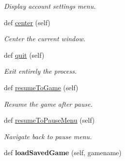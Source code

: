 \begin{DoxyCompactItemize}
\begin{DoxyCompactList}\small\item\em Display account settings menu. \end{DoxyCompactList}\item 
\hypertarget{classsrc_1_1game_1_1_game_a243a1df9b63a0f081b90fa29146a4af6}{}def \hyperlink{classsrc_1_1game_1_1_game_a243a1df9b63a0f081b90fa29146a4af6}{center} (self)\label{classsrc_1_1game_1_1_game_a243a1df9b63a0f081b90fa29146a4af6}

\begin{DoxyCompactList}\small\item\em Center the current window. \end{DoxyCompactList}\item 
\hypertarget{classsrc_1_1game_1_1_game_aa7856f8d00f279cc139d131cb2e8d8ea}{}def \hyperlink{classsrc_1_1game_1_1_game_aa7856f8d00f279cc139d131cb2e8d8ea}{quit} (self)\label{classsrc_1_1game_1_1_game_aa7856f8d00f279cc139d131cb2e8d8ea}

\begin{DoxyCompactList}\small\item\em Exit entirely the process. \end{DoxyCompactList}\item 
\hypertarget{classsrc_1_1game_1_1_game_a19d0646df1f0cb57f8262412487d5270}{}def \hyperlink{classsrc_1_1game_1_1_game_a19d0646df1f0cb57f8262412487d5270}{resume\+To\+Game} (self)\label{classsrc_1_1game_1_1_game_a19d0646df1f0cb57f8262412487d5270}

\begin{DoxyCompactList}\small\item\em Resume the game after pause. \end{DoxyCompactList}\item 
\hypertarget{classsrc_1_1game_1_1_game_add2df3ddda7fa333cadb6fcfa060eaef}{}def \hyperlink{classsrc_1_1game_1_1_game_add2df3ddda7fa333cadb6fcfa060eaef}{resume\+To\+Pause\+Menu} (self)\label{classsrc_1_1game_1_1_game_add2df3ddda7fa333cadb6fcfa060eaef}

\begin{DoxyCompactList}\small\item\em Navigate back to pause menu. \end{DoxyCompactList}\item 
\hypertarget{classsrc_1_1game_1_1_game_a8e215b6533b7fa858334453633e12e6e}{}def {\bfseries load\+Saved\+Game} (self, gamename)\label{classsrc_1_1game_1_1_game_a8e215b6533b7fa858334453633e12e6e}


\end{DoxyCompactItemize}
